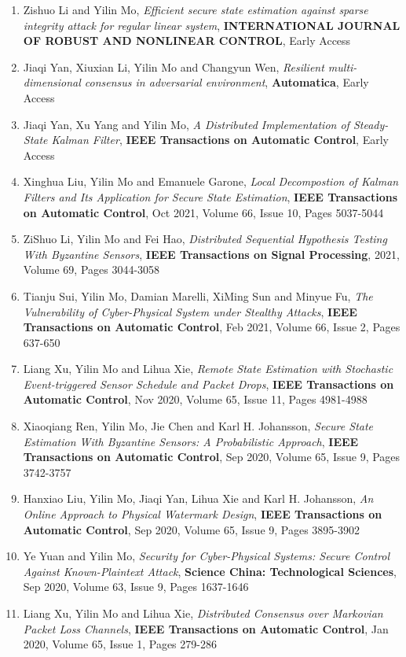 \documentclass[10pt, a4paper]{article}
\begin{document}
\begin{enumerate}
\item Zishuo Li and Yilin Mo, \emph{Efficient secure state estimation against sparse integrity attack for regular linear system}, \textbf{INTERNATIONAL JOURNAL OF ROBUST AND NONLINEAR CONTROL}, Early Access
\item Jiaqi Yan, Xiuxian Li, Yilin Mo and Changyun Wen, \emph{Resilient multi-dimensional consensus in adversarial environment}, \textbf{Automatica}, Early Access
\item Jiaqi Yan, Xu Yang and Yilin Mo, \emph{A Distributed Implementation of Steady-State Kalman Filter}, \textbf{IEEE Transactions on Automatic Control}, Early Access
\item Xinghua Liu, Yilin Mo and Emanuele Garone, \emph{{Local Decompostion of Kalman Filters and Its Application for Secure State Estimation}}, \textbf{IEEE Transactions on Automatic Control}, Oct 2021, Volume 66, Issue 10, Pages 5037-5044
\item ZiShuo Li, Yilin Mo and Fei Hao, \emph{Distributed Sequential Hypothesis Testing With Byzantine Sensors}, \textbf{IEEE Transactions on Signal Processing}, 2021, Volume 69, Pages 3044-3058
\item Tianju Sui, Yilin Mo, Damian Marelli, XiMing Sun and Minyue Fu, \emph{The Vulnerability of Cyber-Physical System under Stealthy Attacks}, \textbf{IEEE Transactions on Automatic Control}, Feb 2021, Volume 66, Issue 2, Pages 637-650
\item Liang Xu, Yilin Mo and Lihua Xie, \emph{Remote State Estimation with Stochastic Event-triggered Sensor Schedule and Packet Drops}, \textbf{IEEE Transactions on Automatic Control}, Nov 2020, Volume 65, Issue 11, Pages 4981-4988
\item Xiaoqiang Ren, Yilin Mo, Jie Chen and Karl H. Johansson, \emph{Secure State Estimation With Byzantine Sensors: A Probabilistic Approach}, \textbf{IEEE Transactions on Automatic Control}, Sep 2020, Volume 65, Issue 9, Pages 3742-3757
\item Hanxiao Liu, Yilin Mo, Jiaqi Yan, Lihua Xie and Karl H. Johansson, \emph{{An Online Approach to Physical Watermark Design}}, \textbf{IEEE Transactions on Automatic Control}, Sep 2020, Volume 65, Issue 9, Pages 3895-3902
\item Ye Yuan and Yilin Mo, \emph{Security for Cyber-Physical Systems: Secure Control Against Known-Plaintext Attack}, \textbf{Science China: Technological Sciences}, Sep 2020, Volume 63, Issue 9, Pages 1637-1646
\item Liang Xu, Yilin Mo and Lihua Xie, \emph{Distributed Consensus over Markovian Packet Loss Channels}, \textbf{IEEE Transactions on Automatic Control}, Jan 2020, Volume 65, Issue 1, Pages 279-286

\end{enumerate}
\end{document}
